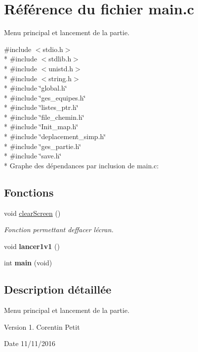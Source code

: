 \hypertarget{a00026}{}\section{Référence du fichier main.\+c}
\label{a00026}


Menu principal et lancement de la partie.  


{\ttfamily \#include $<$stdio.\+h$>$}\\*
{\ttfamily \#include $<$stdlib.\+h$>$}\\*
{\ttfamily \#include $<$unistd.\+h$>$}\\*
{\ttfamily \#include $<$string.\+h$>$}\\*
{\ttfamily \#include \char`\"{}global.\+h\char`\"{}}\\*
{\ttfamily \#include \char`\"{}ges\+\_\+equipes.\+h\char`\"{}}\\*
{\ttfamily \#include \char`\"{}listes\+\_\+ptr.\+h\char`\"{}}\\*
{\ttfamily \#include \char`\"{}file\+\_\+chemin.\+h\char`\"{}}\\*
{\ttfamily \#include \char`\"{}Init\+\_\+map.\+h\char`\"{}}\\*
{\ttfamily \#include \char`\"{}deplacement\+\_\+simp.\+h\char`\"{}}\\*
{\ttfamily \#include \char`\"{}ges\+\_\+partie.\+h\char`\"{}}\\*
{\ttfamily \#include \char`\"{}save.\+h\char`\"{}}\\*
Graphe des dépendances par inclusion de main.\+c\+:
\subsection*{Fonctions}
\begin{DoxyCompactItemize}
\item 
void \hyperlink{a00026_a9d7e8af417b6d543da691e9c0e2f6f9f}{clear\+Screen} ()\hypertarget{a00026_a9d7e8af417b6d543da691e9c0e2f6f9f}{}\label{a00026_a9d7e8af417b6d543da691e9c0e2f6f9f}

\begin{DoxyCompactList}\small\item\em Fonction permettant d\textquotesingle{}effacer l\textquotesingle{}écran. \end{DoxyCompactList}\item 
void {\bfseries lancer1v1} ()\hypertarget{a00026_adb6688570eade5bbce60e9f6e124de44}{}\label{a00026_adb6688570eade5bbce60e9f6e124de44}

\item 
int {\bfseries main} (void)\hypertarget{a00026_a840291bc02cba5474a4cb46a9b9566fe}{}\label{a00026_a840291bc02cba5474a4cb46a9b9566fe}

\end{DoxyCompactItemize}


\subsection{Description détaillée}
Menu principal et lancement de la partie. 

\begin{DoxyVersion}{Version}
1.  Corentin Petit 
\end{DoxyVersion}
\begin{DoxyDate}{Date}
11/11/2016 
\end{DoxyDate}
